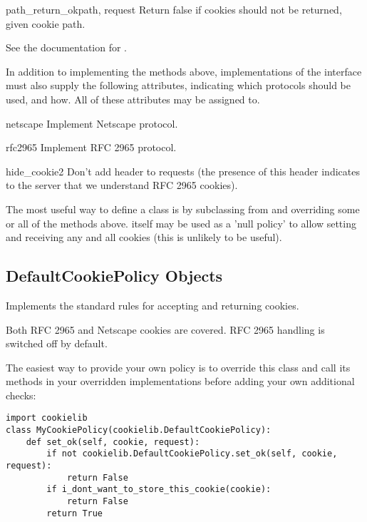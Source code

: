 \begin{methoddesc}[CookiePolicy]{path_return_ok}{path, request}
Return false if cookies should not be returned, given cookie path.

See the documentation for .
\end{methoddesc}


In addition to implementing the methods above, implementations of the
 interface must also supply the following
attributes, indicating which protocols should be used, and how.  All
of these attributes may be assigned to.

\begin{memberdesc}{netscape}
Implement Netscape protocol.
\end{memberdesc}
\begin{memberdesc}{rfc2965}
Implement RFC 2965 protocol.
\end{memberdesc}
\begin{memberdesc}{hide_cookie2}
Don't add  header to requests (the presence of
this header indicates to the server that we understand RFC 2965
cookies).
\end{memberdesc}

The most useful way to define a  class is by
subclassing from  and overriding some or
all of the methods above.   itself may be used as
a 'null policy' to allow setting and receiving any and all cookies
(this is unlikely to be useful).


\subsection{DefaultCookiePolicy Objects \label{default-cookie-policy-objects}}

Implements the standard rules for accepting and returning cookies.

Both RFC 2965 and Netscape cookies are covered.  RFC 2965 handling is
switched off by default.

The easiest way to provide your own policy is to override this class
and call its methods in your overridden implementations before adding
your own additional checks:

\begin{verbatim}
import cookielib
class MyCookiePolicy(cookielib.DefaultCookiePolicy):
    def set_ok(self, cookie, request):
        if not cookielib.DefaultCookiePolicy.set_ok(self, cookie, request):
            return False
        if i_dont_want_to_store_this_cookie(cookie):
            return False
        return True
\end{verbatim}

